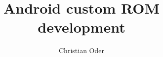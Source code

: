 \documentclass[oneside, english, final]{sdqseminar}
\author{Christian  Oder}
\title{Android custom ROM development}
\begin{document}
\setpdf

\maketitle

 

\begin{abstract}

\end{abstract}



\newpage

\newpage

\newpage


\printnoidxglossary
\printnoidxglossary[type=\acronymtype]



\end{document}
